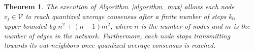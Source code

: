 \documentclass[twocolumn]{autart}    %
\newtheorem{theorem}{Theorem}
\begin{document}



\begin{theorem}
\label{PROP1_max}
The execution of Algorithm~\ref{algorithm_max} allows each node $v_j \in \mathcal{V}$ to reach quantized average consensus after a finite number of steps $k_0$ upper bounded by $n^2 + (n-1)m^2$, where $n$ is the number of nodes and $m$ is the number of edges in the network. 
Furthermore, each node stops transmitting towards its out-neighbors once quantized average consensus is reached. 
\end{theorem} 
\end{document}
